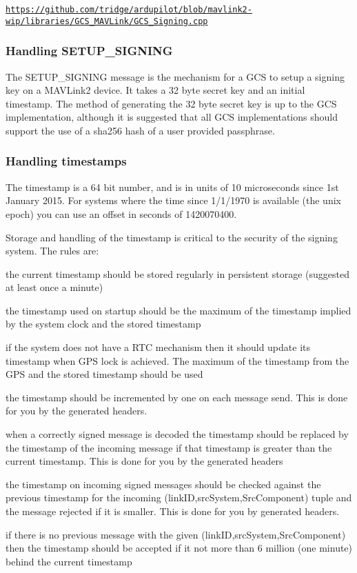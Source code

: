 \href{https://github.com/tridge/ardupilot/blob/mavlink2-wip/libraries/GCS_MAVLink/GCS_Signing.cpp}{\tt https\+://github.\+com/tridge/ardupilot/blob/mavlink2-\/wip/libraries/\+G\+C\+S\+\_\+\+M\+A\+V\+Link/\+G\+C\+S\+\_\+\+Signing.\+cpp}

\subsubsection*{Handling S\+E\+T\+U\+P\+\_\+\+S\+I\+G\+N\+I\+NG}

The S\+E\+T\+U\+P\+\_\+\+S\+I\+G\+N\+I\+NG message is the mechanism for a G\+CS to setup a signing key on a M\+A\+V\+Link2 device. It takes a 32 byte secret key and an initial timestamp. The method of generating the 32 byte secret key is up to the G\+CS implementation, although it is suggested that all G\+CS implementations should support the use of a sha256 hash of a user provided passphrase.

\subsubsection*{Handling timestamps}

The timestamp is a 64 bit number, and is in units of 10 microseconds since 1st January 2015. For systems where the time since 1/1/1970 is available (the unix epoch) you can use an offset in seconds of 1420070400.

Storage and handling of the timestamp is critical to the security of the signing system. The rules are\+:


\begin{DoxyItemize}
\item the current timestamp should be stored regularly in persistent storage (suggested at least once a minute)
\item the timestamp used on startup should be the maximum of the timestamp implied by the system clock and the stored timestamp
\item if the system does not have a R\+TC mechanism then it should update its timestamp when G\+PS lock is achieved. The maximum of the timestamp from the G\+PS and the stored timestamp should be used
\item the timestamp should be incremented by one on each message send. This is done for you by the generated headers.
\item when a correctly signed message is decoded the timestamp should be replaced by the timestamp of the incoming message if that timestamp is greater than the current timestamp. This is done for you by the generated headers
\item the timestamp on incoming signed messages should be checked against the previous timestamp for the incoming (link\+ID,src\+System,Src\+Component) tuple and the message rejected if it is smaller. This is done for you by generated headers.
\item if there is no previous message with the given (link\+ID,src\+System,Src\+Component) then the timestamp should be accepted if it not more than 6 million (one minute) behind the current timestamp
\end{DoxyItemize}

